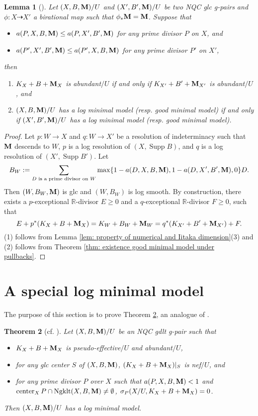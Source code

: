 \documentclass[11pt]{amsart}
\numberwithin{equation}{section}
\newcommand{\Mm}{{\bf{M}}}
\newcommand{\Rr}{\mathbb{R}}
\newcommand{\Center}{\operatorname{center}}
\newcommand{\Supp}{\operatorname{Supp}}
\newcommand{\Ngklt}{\operatorname{Ngklt}}
\newtheorem{thm}{Theorem}[section]
\newtheorem{lem}[thm]{Lemma}
\theoremstyle{definition}
\theoremstyle{definition}
\theoremstyle{definition}
\begin{document}
\begin{lem}[{\cite[Lemma 3.9]{Has22}}]\label{lem: has22 3.9 rel} Let $(X,B,\Mm)/U$ and $(X',B',\Mm)/U$ be two NQC glc g-pairs and $\phi: X\dashrightarrow X'$ a birational map such that $\phi_*\Mm=\Mm$. Suppose that
\begin{itemize}
    \item $a(P,X,B,\Mm)\leq a(P,X',B',\Mm)$ for any prime divisor $P$ on $X$, and
    \item $a(P',X',B',\Mm)\leq a(P',X,B,\Mm)$ for any prime divisor $P'$ on $X'$, 
\end{itemize}
then
\begin{enumerate}
    \item $K_X+B+\Mm_{X}$ is abundant$/U$ if and only if $K_{X'}+B'+\Mm_{X'}$ is abundant$/U$, and
    \item $(X,B,\Mm)/U$ has a log minimal model (resp. good minimal model) if and only if $(X',B',\Mm)/U$ has a log minimal model (resp. good minimal model).
\end{enumerate}
\end{lem}

\begin{proof}
Let $p: W\rightarrow X$ and $q: W\rightarrow X'$ be a resolution of indeterminacy such that $\Mm$ descends to $W$, $p$ is a log resolution of $(X,\Supp B)$, and $q$ is a log resolution of $(X',\Supp B')$. Let
$$B_W:=\sum_{D\text{ is a prime divisor on }W}\max\{1-a(D,X,B,\Mm),1-a(D,X',B',\Mm),0\}D.$$
Then $(W,B_W,\Mm)$ is glc and $(W,B_W)$ is log smooth. By construction, there exists a $p$-exceptional $\Rr$-divisor $E\geq 0$ and a $q$-exceptional $\Rr$-divisor $F\geq 0$, such that
$$E+p^*(K_X+B+\Mm_X)=K_W+B_W+\Mm_W=q^*(K_{X'}+B'+\Mm_{X'})+F.$$
(1) follows from Lemma \ref{lem: property of numerical and Iitaka dimension}(3) and (2) follows from Theorem \ref{thm: existence good minimal model under pullbacks}.
\end{proof}

\section{A special log minimal model}

The purpose of this section is to prove Theorem \ref{thm: has22 3.14 rel ver}, an analogue of \cite[Theorem 3.14]{Has22}. 

\begin{thm}[{cf. \cite[Theorem 3.14]{Has22}}]\label{thm: has22 3.14 rel ver}
Let $(X,B,\Mm)/U$ be an NQC gdlt g-pair such that
\begin{itemize}
    \item $K_X+B+\Mm_X$ is pseudo-effective$/U$ and abundant$/U$,
    \item for any glc center $S$ of $(X,B,\Mm)$, $(K_X+B+\Mm_X)|_S$ is nef$/U$, and
    \item for any prime divisor $P$ over $X$ such that $a(P,X,B,\Mm)<1$ and $\Center_XP\cap\Ngklt(X,B,\Mm)\not=\emptyset$, $\sigma_P(X/U,K_X+B+\Mm_X)=0$.
\end{itemize}
Then $(X,B,\Mm)/U$ has a log minimal model.
\end{thm}
\end{document}

